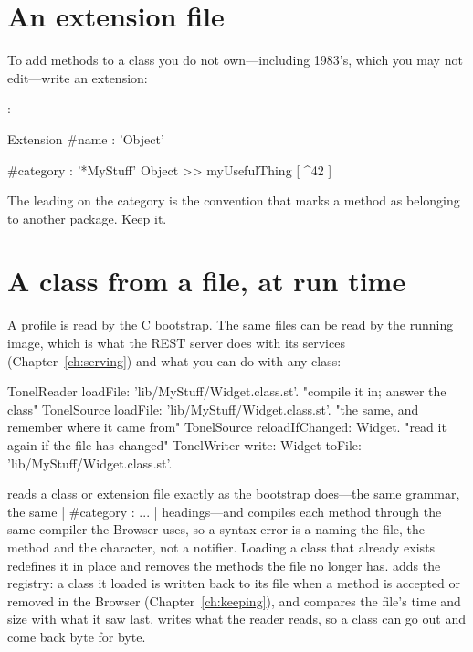 \section{An extension file}

To add methods to a class you do not own---including 1983's, which you may not
edit---write an extension:

:

\begin{st}
Extension { #name : 'Object' }

{ #category : '*MyStuff' }
Object >> myUsefulThing [
	^42
]
\end{st}

The leading \ct{*} on the category is the convention that marks a method as
belonging to another package. Keep it.

\section{A class from a file, at run time}

A profile is read by the C bootstrap. The same files can be read by the
running image, which is what the REST server does with its services
(Chapter~\ref{ch:serving}) and what you can do with any class:

\begin{st}
TonelReader loadFile: 'lib/MyStuff/Widget.class.st'.     "compile it in; answer the class"
TonelSource loadFile: 'lib/MyStuff/Widget.class.st'.     "the same, and remember where it came from"
TonelSource reloadIfChanged: Widget.                     "read it again if the file has changed"
TonelWriter write: Widget toFile: 'lib/MyStuff/Widget.class.st'.
\end{st}

 reads a class or extension file exactly as the bootstrap
does---the same grammar, the same \ct|{ #category : ... }| headings---and
compiles each method through the same compiler the Browser uses, so a syntax
error is a  naming the file, the method and the character,
not a notifier. Loading a class that already exists redefines it in place
and removes the methods the file no longer has.  adds the
registry: a class it loaded is written back to its file when a method is
accepted or removed in the Browser (Chapter~\ref{ch:keeping}), and
 compares the file's time and size with what it saw
last.  writes what the reader reads, so a class can go out
and come back byte for byte.

